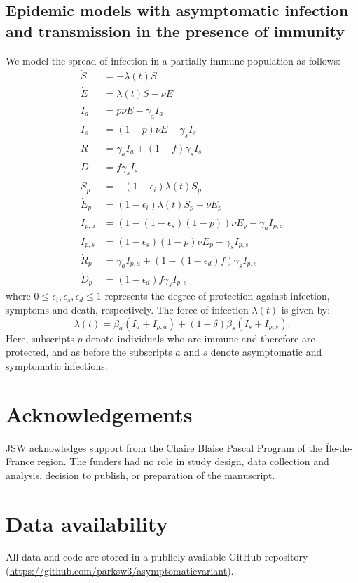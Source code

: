 \documentclass[12pt]{article}
\begin{document}
\subsection*{Epidemic models with asymptomatic infection and transmission in the presence of immunity}

We model the spread of infection in a partially immune population as follows:
\begin{align}
\dot{S} &= -\lambda (t) S \\
\dot{E} &= \lambda (t) S - \nu E\\
\dot{I}_a &= p \nu E - \gamma_a I_a\\
\dot{I}_s &= (1-p) \nu E -\gamma_s I_s\\
\dot{R} &= \gamma_a I_a + (1-f) \gamma_s I_s \\
\dot{D} &= f \gamma_s I_s\\
\dot{S}_p &= - (1-\epsilon_i) \lambda (t) S_p \\
\dot{E}_p &= (1-\epsilon_i) \lambda (t) S_p - \nu E_p\\
\dot{I}_{p, a} &= (1 - (1-\epsilon_s) (1-p)) \nu E_p - \gamma_a I_{p,a}\\
\dot{I}_{p, s} &= (1-\epsilon_s) (1-p) \nu E_p -\gamma_s I_{p,s}\\
\dot{R}_p &= \gamma_a I_{p,a} + (1-(1-\epsilon_d) f) \gamma_s I_{p,s} \\
\dot{D}_p &= (1-\epsilon_d) f \gamma_s I_{p,s}
\end{align}
where $0\leq \epsilon_i, \epsilon_s, \epsilon_d \leq 1$ represents the degree of protection against infection, symptoms and death, respectively. 
The force of infection $\lambda(t)$ is given by:
\begin{equation}
\lambda(t) = \beta_a (I_a + I_{p,a}) + (1-\delta) \beta_s (I_s + I_{p,s}).
\end{equation}
Here, subscripts $p$ denote individuals who are immune and therefore are protected, and as before the subscripts $a$ and $s$ denote asymptomatic and symptomatic infections.

\section*{Acknowledgements}

JSW acknowledges support from the Chaire Blaise Pascal Program of the Île-de-France region.
The funders had no role in study design, data collection and analysis, decision to publish, or preparation of the manuscript. 

\section*{Data availability}

All data and code are stored in a publicly available GitHub repository (\url{https://github.com/parksw3/asymptomaticvariant}).

\pagebreak


\end{document}
